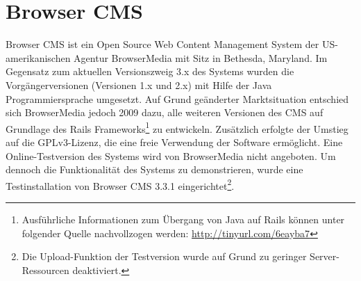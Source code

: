 \section{Browser CMS}
Browser CMS ist ein Open Source Web Content Management System der US-amerikanischen Agentur BrowserMedia mit Sitz in Bethesda, Maryland. Im Gegensatz zum aktuellen Versionszweig 3.x des Systems wurden die Vorgängerversionen (Versionen 1.x und 2.x) mit Hilfe der Java Programmiersprache umgesetzt.
Auf Grund geänderter Marktsituation entschied sich BrowserMedia jedoch 2009 dazu, alle weiteren Versionen des CMS auf Grundlage des Rails Frameworks\footnote{Ausführliche Informationen zum Übergang von Java auf Rails können unter folgender Quelle nachvollzogen werden: \href{http://tinyurl.com/6eayba7
}{http://tinyurl.com/6eayba7}} zu entwickeln. Zusätzlich erfolgte der Umstieg auf die GPLv3-Lizenz, die eine freie Verwendung der Software ermöglicht.
Eine Online-Testversion des Systems wird von BrowserMedia nicht angeboten. Um dennoch die Funktionalität des Systems zu demonstrieren, wurde eine Testinstallation von Browser CMS 3.3.1 eingerichtet\footnote{Die Upload-Funktion der Testversion wurde auf Grund zu geringer Server-Ressourcen deaktiviert.}.
